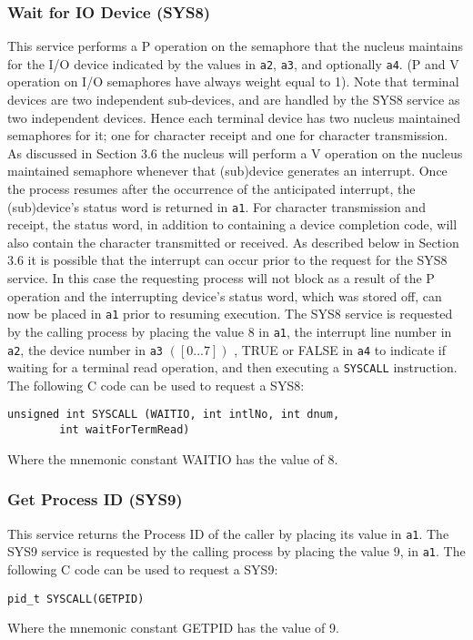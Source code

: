 \subsubsection{Wait for IO Device (SYS8)}
This service performs a P operation on the semaphore that the nucleus maintains
for the I/O device indicated by the values in \verb+a2+, \verb+a3+, and optionally
\verb+a4+. (P and V operation on I/O semaphores have always weight equal to
1).
Note that terminal devices are two independent sub-devices, and are handled by the SYS8 service as two independent devices. Hence
each terminal device has two nucleus maintained semaphores for it; one for character receipt and one for character transmission.
As discussed in Section 3.6 the nucleus will perform a V operation on the
nucleus maintained semaphore whenever that (sub)device generates an interrupt.
Once the process resumes after the occurrence of the anticipated interrupt,
the (sub)device's status word is returned in \verb+a1+. For character transmission and
receipt, the status word, in addition to containing a device completion code, will
also contain the character transmitted or received.
As described below in Section 3.6 it is possible that the interrupt can occur
prior to the request for the SYS8 service. In this case the requesting process will
not block as a result of the P operation and the interrupting device's status word,
which was stored off, can now be placed in \verb+a1+ prior to resuming execution.
The SYS8 service is requested by the calling process by placing the value 8
in \verb+a1+, the interrupt line number in \verb+a2+, the device number in
\verb+a3+ $([0. . .7])$ , TRUE
or FALSE in \verb+a4+ to indicate if waiting for a terminal read operation, and then
executing a \verb+SYSCALL+ instruction.
The following C code can be used to request a SYS8:
\begin{verbatim}
unsigned int SYSCALL (WAITIO, int intlNo, int dnum,
		int waitForTermRead)
\end{verbatim}
Where the mnemonic constant WAITIO has the value of 8.
\subsubsection{Get Process ID (SYS9)}
This service returns the Process ID of the caller by placing its value in
\verb+a1+.
The SYS9 service is requested by the calling process by placing the value
9, in \verb+a1+.
The following C code can be used to request a SYS9:
\begin{verbatim}
pid_t SYSCALL(GETPID)
\end{verbatim}
Where the mnemonic constant GETPID has the value of 9.
